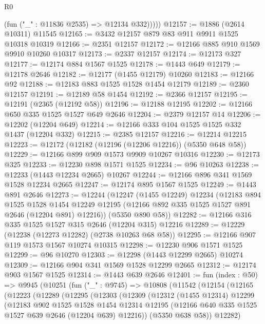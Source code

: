 \begin{lexlean}{R0}
\begin{coremodule}
            (fun ("_" : @11836 @2535) => @12134 @332)))))
@12157 := @1886 (@2614 @10311) @11545
@12165 := @3432 @12157 @879 @83 @911 @9911 @1525 @10318 @10319
@12166 := @2351 @12157
@12172 := @12166 @885 @910 @1569 @9910 @10260 @10317
@12173 := @2337 @12157
@12174 := @12173 @327
@12177 := @12174 @884 @1567 @1525
@12178 := @1443 @649
@12179 := @12178 @2646
@12182 := @12177 (@1455 @12179) @10260
@12183 := @12166 @92
@12188 := @12183 @883 @1525 @1528 @1454 @12179
@12189 := @2360 @12157
@12191 := @12189 @58 @1454
@12192 := @2366 @12157
@12195 := @12191 (@2365 (@12192 @58))
@12196 := @12188 @12195
@12202 := @12166 @650 @335 @1525 @1527 @649 @2646
@12204 := @2379 @12157 @14
@12206 := @12202 (@12204 @649)
@12214 := @12166 @333 @104 @1525 @1525 @332 @1437 (@12204 @332)
@12215 := @2385 @12157
@12216 := @12214 @12215
@12223 := @12172 (@12182 (@12196 (@12206 @12216)) (@5350 @648 @58))
@12229 := @12166 @899 @909 @1573 @9909 @10267 @10316
@12230 := @12173 @325
@12233 := @12230 @898 @1571 @1525
@12234 := @96 @10263
@12238 := @12233 (@1443 @12234 @2665) @10267
@12244 := @12166 @896 @341 @1569 @1528 @12234 @2665
@12247 := @12174 @895 @1567 @1525
@12249 := @1443 @891 @2646
@12273 := @12244
    (@12247
      (@1455 @12249)
      @12234
      (@12183
        @894
        @1525
        @1528
        @1454
        @12249
        @12195
        (@12166 @892 @335 @1525 @1527 @891 @2646 (@12204 @891) @12216))
      (@5350 @890 @58))
@12282 := @12166 @316 @335 @1525 @1527 @315 @2646 (@12204 @315) @12216
@12289 := @12229 (@12238 (@12273 @12282) (@2738 @10263 @68 @58))
@12295 := @12166 @907 @119 @1573 @1567 @10274 @10315
@12298 := @12230 @906 @1571 @1525
@12299 := @96 @10270
@12303 := @12298 (@1443 @12299 @2665) @10274
@12309 := @12166 @904 @341 @1569 @1528 @12299 @2665
@12312 := @12174 @903 @1567 @1525
@12314 := @1443 @639 @2646
@12401 := fun (index : @50) =>
  @9945
    (@10251
      (fun ("_" : @9745) =>
      @10808
        (@11542
          (@12154
            (@12165
              (@12223
                (@12289
                  (@12295
                    (@12303
                      (@12309
                        (@12312
                          (@1455 @12314)
                          @12299
                          (@12183
                            @902
                            @1525
                            @1528
                            @1454
                            @12314
                            @12195
                            (@12166 @640 @335 @1525 @1527 @639 @2646 (@12204 @639) @12216))
                          (@5350 @638 @58))
                        @12282)

\end{coremodule}
\end{lexlean}
